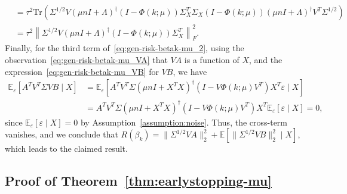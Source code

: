 \documentclass[11pt]{article}
\newenvironment{proof*}
  {\par\pushQED{\qed}\normalfont\ignorespaces}
  {\popQED\par}
\begin{document}
\begin{proof*}
\begin{align*}
    &= \tau^2 \mathrm{Tr}( \Sigma^{1/2} V (\mu n I + \Lambda)^{\dagger} (I - \Phi(k;\mu)) \Sigma_X^T \Sigma_X (I - \Phi(k;\mu)) (\mu n I + \Lambda)^{\dagger} V^T \Sigma^{1/2}) \\
    &= \tau^2 \left\| \Sigma^{1/2} V (\mu n I + \Lambda)^{\dagger}  (I - \Phi(k; \mu)) \Sigma_X^T \right\|_F^2.
\end{align*}
Finally, for the third term of~\eqref{eq:gen-risk-betak-mu_2}, using the observation~\eqref{eq:gen-risk-betak-mu_VA} that $VA$ is a function of $X$, and the expression~\eqref{eq:gen-risk-betak-mu_VB} for $VB$, we have
\begin{align*}
    \mathbb{E}_\varepsilon \left[ A^T V^T \Sigma V B \mid X \right]
    &= \mathbb{E}_\varepsilon \left[ A^T V^T \Sigma (\mu n I + X^T X)^{\dagger} (I - V \Phi(k;\mu) V^T) X^T \varepsilon \mid X \right] \\
    &= A^T V^T \Sigma (\mu n I + X^T X)^{\dagger} (I - V \Phi(k;\mu) V^T) X^T \mathbb{E}_\varepsilon \left[ \varepsilon \mid X \right] = 0,
\end{align*}
since $\mathbb{E}_{\varepsilon}[\varepsilon \mid X] = 0$ by Assumption~\ref{assumption:noise}. Thus, the cross-term vanishes, and we conclude that $R(\beta_k) = \| \Sigma^{1/2} VA \|_2^2 + \mathbb{E}[\| \Sigma^{1/2} V B \|_2^2 \mid X]$, which leads to the claimed result.
\end{proof*}

\subsection{Proof of Theorem~\ref{thm:earlystopping-mu}}
\end{document}
